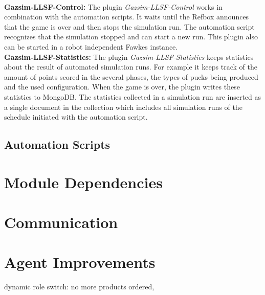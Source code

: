 \\
\textbf{Gazsim-LLSF-Control:}
The plugin \textit{Gazsim-LLSF-Control} works in combination with the automation scripts. It waits until the Refbox announces that the game is over and then stops the simulation run. The automation script recognizes that the simulation stopped and can start a new run. This plugin also can be started in a robot independent Fawkes instance.
\\
\textbf{Gazsim-LLSF-Statistics:}
The plugin \textit{Gazsim-LLSF-Statistics} keeps statistics about the result of automated simulation runs. For example it keeps track of the amount of points scored in the several phases, the types of pucks being produced and the used configuration. When the game is over, the plugin writes these statistics to MongoDB. The statistics collected in a simulation run are inserted as a single document in the collection which includes all simulation runs of the schedule initiated with the automation script.



\subsection{Automation Scripts}


\section{Module Dependencies}
\label{sec:module_dependencies}


\section{Communication}
\label{sec:imp_communication}


\section{Agent Improvements}
\label{sec:agent_improvements}
dynamic role switch: no more products ordered, \cite{dynamic_role_assignment}
